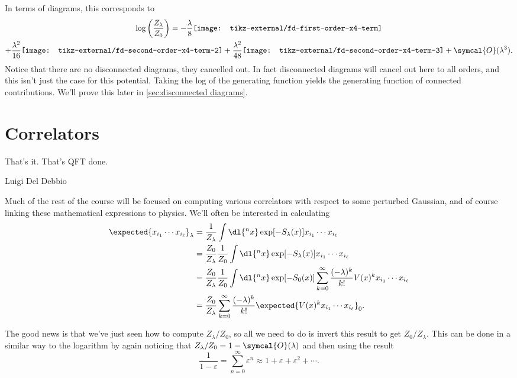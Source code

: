 \documentclass[fleqn]{NotesClass}
\newcommand{\order}{\symcal{O}}
\begin{document}
    In terms of diagrams, this corresponds to
    \begin{multline}
        \log\left( \frac{Z_\lambda}{Z_0} \right) = -\frac{\lambda}{8} 
        \vcenter{\hbox{\texttt{[image: tikz-external/fd-first-order-x4-term]}}}\\
        + \frac{\lambda^2}{16} \vcenter{\hbox{\texttt{[image: tikz-external/fd-second-order-x4-term-2]}}} + \frac{\lambda^2}{48} \vcenter{\hbox{\texttt{[image: tikz-external/fd-second-order-x4-term-3]}}} + \order(\lambda^3).
    \end{multline}
    Notice that there are no disconnected diagrams, they cancelled out.
    In fact disconnected diagrams will cancel out here to all orders, and this isn't just the case for this potential.
    Taking the log of the generating function yields the generating function of connected contributions.
    We'll prove this later in \cref{sec:disconnected diagrams}.
    
    \section{Correlators}
    \epigraph{That's it. That's QFT done.}{Luigi Del Debbio}
    Much of the rest of the course will be focused on computing various correlators with respect to some perturbed Gaussian, and of course linking these mathematical expressions to physics.
    We'll often be interested in calculating
    \begin{align}
        \expected{x_{i_1} \dotsm x_{i_\ell}}_\lambda &= \frac{1}{Z_\lambda} \int \dl{^nx} \exp[-S_\lambda(x)] x_{i_1} \dotsm x_{i_\ell}\\
        &= \frac{Z_0}{Z_\lambda} \frac{1}{Z_0} \int \dl{^nx} \exp[-S_\lambda(x)] x_{i_1} \dotsm x_{i_\ell}\\
        &= \frac{Z_0}{Z_\lambda} \frac{1}{Z_0} \int \dl{^nx} \exp[-S_0(x)] \sum_{k = 0}^{\infty} \frac{(-\lambda)^k}{k!} V(x)^k x_{i_1} \dotsm x_{i_\ell}\\
        &= \frac{Z_0}{Z_\lambda} \sum_{k = 0}^{\infty} \frac{(-\lambda)^k}{k!} \expected{V(x)^kx_{i_1} \dotsm x_{i_\ell}}_0.
    \end{align}
    
    The good news is that we've just seen how to compute \(Z_\lambda/Z_0\), so all we need to do is invert this result to get \(Z_0/Z_\lambda\).
    This can be done in a similar way to the logarithm by again noticing that \(Z_\lambda/Z_0 = 1 - \order(\lambda)\) and then using the result
    \begin{equation}
        \frac{1}{1 - \varepsilon} = \sum_{n = 0}^{\infty} \varepsilon^n \approx 1 + \varepsilon + \varepsilon^2 + \dotsb.
    \end{equation}
    
\end{document}
